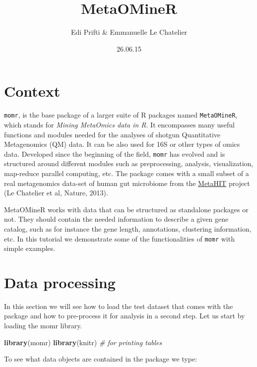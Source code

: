 \documentclass[]{article}
\title{MetaOMineR}
\author{Edi Prifti \& Emmanuelle Le Chatelier}
\date{26.06.15}
\newenvironment{Shaded}{\begin{snugshade}}{\end{snugshade}}
\newcommand{\KeywordTok}[1]{\textcolor[rgb]{0.13,0.29,0.53}{\textbf{{#1}}}}
\newcommand{\CommentTok}[1]{\textcolor[rgb]{0.56,0.35,0.01}{\textit{{#1}}}}
\newcommand{\NormalTok}[1]{{#1}}
\begin{document}
\maketitle


{
\hypersetup{linkcolor=black}
\setcounter{tocdepth}{3}
\tableofcontents
}
\section{Context}\label{context}

\texttt{momr}, is the base package of a larger suite of R packages named
\texttt{MetaOMineR}, which stands for \emph{Mining MetaOmics data in R}.
It encompasses many useful functions and modules needed for the analyses
of shotgun Quantitative Metagenomics (QM) data. It can be also used for
16S or other types of omics data. Developed since the beginning of the
field, \texttt{momr} has evolved and is structured around different
modules such as preprocessing, analysis, visualization, map-reduce
parallel computing, etc. The package comes with a small subset of a real
metagenomics data-set of human gut microbiome from the
\href{http://metahit.eu}{MetaHIT} project (Le Chatelier et al, Nature,
2013).

MetaOMineR works with data that can be structured as standalone packages
or not. They should contain the needed information to describe a given
gene catalog, such as for instance the gene length, annotations,
clustering information, etc. In this tutorial we demonstrate some of the
functionalities of \texttt{momr} with simple examples.

\section{Data processing}\label{data-processing}

In this section we will see how to load the test dataset that comes with
the package and how to pre-process it for analysis in a second step. Let
us start by loading the momr library.

\begin{Shaded}
\begin{Highlighting}[]
\KeywordTok{library}\NormalTok{(momr)}
\KeywordTok{library}\NormalTok{(knitr) }\CommentTok{# for printing tables}
\end{Highlighting}
\end{Shaded}

To see what data objects are contained in the package we type:
\end{document}
